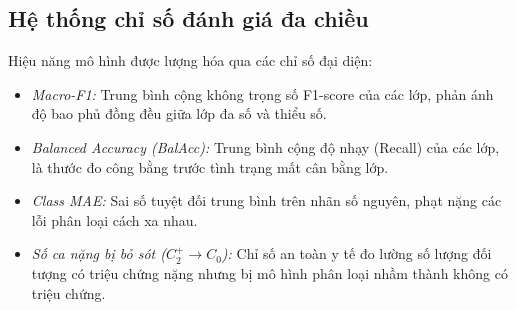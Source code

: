 \subsection{Hệ thống chỉ số đánh giá đa chiều}
Hiệu năng mô hình được lượng hóa qua các chỉ số đại diện:
\begin{itemize}
    \item \textit{Macro-F1:} Trung bình cộng không trọng số F1-score của các lớp, phản ánh độ bao phủ đồng đều giữa lớp đa số và thiểu số.
    \item \textit{Balanced Accuracy (BalAcc):} Trung bình cộng độ nhạy (Recall) của các lớp, là thước đo công bằng trước tình trạng mất cân bằng lớp.
    \item \textit{Class MAE:} Sai số tuyệt đối trung bình trên nhãn số nguyên, phạt nặng các lỗi phân loại cách xa nhau.
    \item \textit{Số ca nặng bị bỏ sót ($C_2^+ \to C_0$):} Chỉ số an toàn y tế đo lường số lượng đối tượng có triệu chứng nặng nhưng bị mô hình phân loại nhầm thành không có triệu chứng.
\end{itemize}
